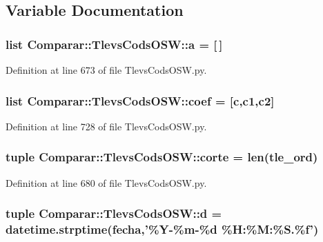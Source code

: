 \subsection{\-Variable \-Documentation}
\subsubsection[{a}]{\setlength{\rightskip}{0pt plus 5cm}list {\bf \-Comparar\-::\-Tlevs\-Cods\-O\-S\-W\-::a} = [$\,$]}\label{namespace_comparar_1_1_tlevs_cods_o_s_w_a4359ad8c851e8a3975ec8a52f6e82661}


\-Definition at line 673 of file \-Tlevs\-Cods\-O\-S\-W.\-py.

\subsubsection[{coef}]{\setlength{\rightskip}{0pt plus 5cm}list {\bf \-Comparar\-::\-Tlevs\-Cods\-O\-S\-W\-::coef} = [c,c1,c2]}\label{namespace_comparar_1_1_tlevs_cods_o_s_w_a9ce743d5d29f2b0c385bcf64c39d155e}


\-Definition at line 728 of file \-Tlevs\-Cods\-O\-S\-W.\-py.

\subsubsection[{corte}]{\setlength{\rightskip}{0pt plus 5cm}tuple {\bf \-Comparar\-::\-Tlevs\-Cods\-O\-S\-W\-::corte} = len({\bf tle\-\_\-ord})}\label{namespace_comparar_1_1_tlevs_cods_o_s_w_a1a5c4f744ba44e6e91411b6a1502736b}


\-Definition at line 680 of file \-Tlevs\-Cods\-O\-S\-W.\-py.

\subsubsection[{d}]{\setlength{\rightskip}{0pt plus 5cm}tuple {\bf \-Comparar\-::\-Tlevs\-Cods\-O\-S\-W\-::d} = datetime.\-strptime({\bf fecha},'\%\-Y-\/\%m-\/\%{\bf d} \%\-H\-:\%\-M\-:\%\-S.\%f')}\label{namespace_comparar_1_1_tlevs_cods_o_s_w_a1811fffa84235e16ac8ede40c52ca2ff}


